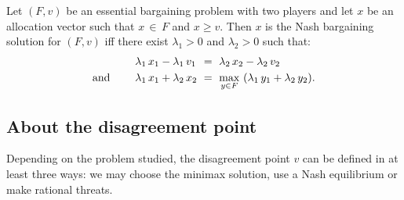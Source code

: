 \begin{theorem}
Let $(F, v)$ be an essential bargaining problem with two players and let $x$ be an allocation vector such that $x \, \in \, F$ and $x \geq v$. Then $x$ is the Nash bargaining solution for $(F, v)$ iff there exist $\lambda_1 > 0$ and $\lambda_2 > 0$ such that:
\begin{align*}
	& \lambda_1 \, x_1 - \lambda_1 \, v_1 \hspace{.03cm} \ = \ \lambda_2 \, x_2 - \lambda_2 \, v_2  \\
	\text{and} \qquad \; & \lambda_1 \, x_1 + \lambda_2 \, x_2 \ = \ \max_{y \in F} \ (\lambda_1 \, y_1 + \lambda_2 \, y_2).
\end{align*}
\end{theorem}



\subsection{About the disagreement point} \label{sec:disagreement}



Depending on the problem studied, the disagreement point $v$ can be defined in at least three ways: we may choose the minimax solution, use a Nash equilibrium or make rational threats.

